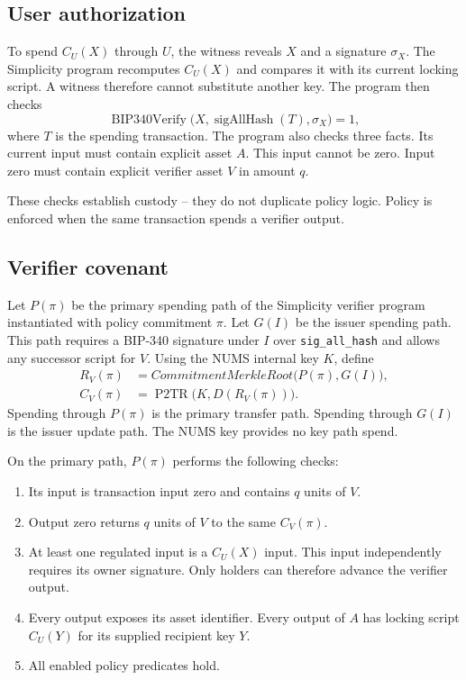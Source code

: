 \documentclass[11pt]{article}
\newcommand{\pTwoTR}{\operatorname{P2TR}}
\begin{document}
    \subsection{User authorization}

    To spend $C_U(X)$ through $U$, the witness reveals $X$ and a signature $\sigma_X$.
    The Simplicity program recomputes $C_U(X)$ and compares it with its current locking script.
    A witness therefore cannot substitute another key.
    The program then checks
    \begin{equation}
        \operatorname{BIP340Verify}\bigl(X,\operatorname{sigAllHash}(T),\sigma_X\bigr)=1,
    \end{equation}
    where $T$ is the spending transaction.
    The program also checks three facts.
    Its current input must contain explicit asset $A$.
    This input cannot be zero.
    Input zero must contain explicit verifier asset $V$ in amount $q$.

    These checks establish custody -- they do not duplicate policy logic.
    Policy is enforced when the same transaction spends a verifier output.

    \subsection{Verifier covenant}

    Let $P(\pi)$ be the primary spending path of the Simplicity verifier program instantiated with policy commitment $\pi$.
    Let $G(I)$ be the issuer spending path.
    This path requires a BIP-340 signature under $I$ over \texttt{sig\_all\_hash} and allows any successor script for $V$.
    Using the NUMS internal key $K$, define
    \begin{align}
        R_V(\pi) &= CommitmentMerkleRoot\bigl(P(\pi),G(I)\bigr), \\
        C_V(\pi) &= \pTwoTR\bigl(K,D(R_V(\pi))\bigr).
    \end{align}
    Spending through $P(\pi)$ is the primary transfer path.
    Spending through $G(I)$ is the issuer update path.
    The NUMS key provides no key path spend.

    On the primary path, $P(\pi)$ performs the following checks:

    \begin{enumerate}
        \item Its input is transaction input zero and contains $q$ units of $V$.
        \item Output zero returns $q$ units of $V$ to the same $C_V(\pi)$.
        \item At least one regulated input is a $C_U(X)$ input. This input independently requires its owner signature. Only holders can therefore advance the verifier output.
        \item Every output exposes its asset identifier. Every output of $A$ has locking script $C_U(Y)$ for its supplied recipient key $Y$.
        \item All enabled policy predicates hold.
    \end{enumerate}
\end{document}
